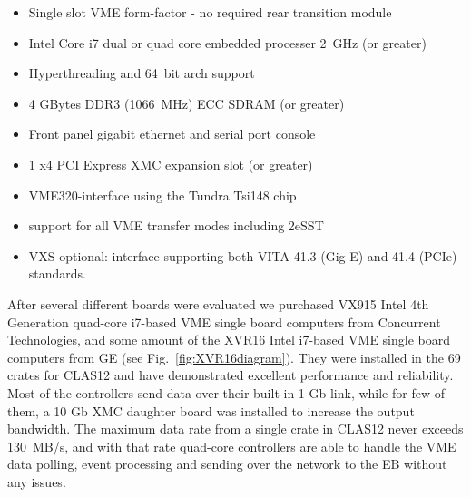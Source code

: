\begin{itemize}
	\item Single slot VME form-factor - no required rear transition module
	\item Intel Core i7 dual or quad core embedded processer 2~GHz (or greater)
	\item Hyperthreading and 64~bit arch support
	\item 4 GBytes DDR3 (1066~MHz) ECC SDRAM (or greater)
	\item Front panel gigabit ethernet and serial port console
	\item 1 x4 PCI Express XMC expansion slot (or greater)
	\item VME320-interface using the Tundra Tsi148 chip
	\item support for all VME transfer modes including 2eSST
	\item VXS optional: interface supporting both VITA 41.3 (Gig E) and 41.4 (PCIe) standards.
\end{itemize}

After several different boards were evaluated we purchased VX915 Intel 4th Generation quad-core i7-based VME single board computers from Concurrent Technologies, and some amount of the XVR16 Intel i7-based VME single board computers from GE (see Fig.~\ref{fig:XVR16diagram}). They were installed in the 69 crates for CLAS12 and have demonstrated excellent performance and reliability. Most of the controllers send data over their built-in 1 Gb link, while for few of them, a 10 Gb XMC daughter board was installed to increase the output bandwidth. The maximum data rate from a single crate in CLAS12 never exceeds 130~MB/s, and with that rate quad-core controllers are able to handle the VME data polling, event processing and sending over the network to the EB without any issues. 

